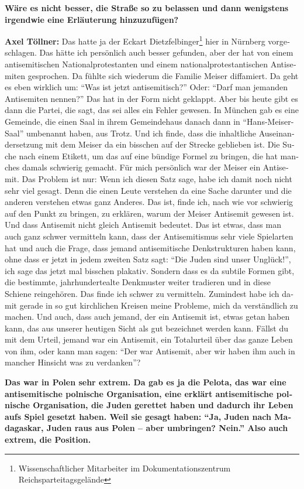 \begin{otherlanguage}{ngerman}
\textbf{Wäre es nicht besser, die Straße so zu belassen und dann wenigstens irgendwie eine Erläuterung hinzuzufügen?} 

\textbf{Axel Töllner:} Das hatte ja der Eckart Dietzfelbinger\footnote{Wissenschaftlicher Mitarbeiter im Dokumentationszentrum Reichsparteitagsgelände} hier in Nürnberg vorgeschlagen. Das hätte ich persönlich auch besser gefunden, aber der hat von einem antisemitischen Nationalprotestanten und einem nationalprotestantischen Antisemiten gesprochen. Da fühlte sich wiederum die Familie Meiser diffamiert. Da geht es eben wirklich um: "`Was ist jetzt antisemitisch?"' Oder: "`Darf man jemanden Antisemiten nennen?"' Das hat in der Form nicht geklappt. Aber bis heute gibt es dann die Partei, die sagt, das sei alles ein Fehler gewesen. In München gab es eine Gemeinde, die einen Saal in ihrem Gemeindehaus danach dann in "`Hans-Meiser-Saal"' umbenannt haben, aus Trotz. Und ich finde, dass die inhaltliche Auseinandersetzung mit dem Meiser da ein bisschen auf der Strecke geblieben ist. Die Suche nach einem Etikett, um das auf eine bündige Formel zu bringen, die hat manches damals schwierig gemacht. Für mich persönlich war der Meiser ein Antisemit. 
Das Problem ist nur: Wenn ich diesen Satz sage, habe ich damit noch nicht sehr viel gesagt. Denn die einen Leute verstehen da eine Sache darunter und die anderen verstehen etwas ganz Anderes. Das ist, finde ich, nach wie vor schwierig auf den Punkt zu bringen, zu erklären, warum der Meiser Antisemit gewesen ist. Und dass Antisemit nicht gleich Antisemit bedeutet. Das ist etwas, dass man auch ganz schwer vermitteln kann, dass der Antisemitismus sehr viele Spielarten hat und auch die Frage, dass jemand antisemitische Denkstrukturen haben kann, ohne dass er jetzt in jedem zweiten Satz sagt: "`Die Juden sind unser Unglück!"', ich sage das jetzt mal bisschen plakativ. Sondern dass es da subtile Formen gibt, die bestimmte, jahrhundertealte Denkmuster weiter tradieren und in diese Schiene reingehören. Das finde ich schwer zu vermitteln. Zumindest habe ich damit gerade in so gut kirchlichen Kreisen meine Probleme, mich da verständlich zu machen. Und auch, dass auch jemand, der ein Antisemit ist, etwas getan haben kann, das aus unserer heutigen Sicht als gut bezeichnet werden kann. Fällst du mit dem Urteil, jemand war ein Antisemit, ein Totalurteil über das ganze Leben von ihm, oder kann man sagen: "`Der war Antisemit, aber wir haben ihm auch in mancher Hinsicht was zu verdanken"'? 
 
\textbf{Das war in Polen sehr extrem. Da gab es ja die Pelota, das war eine antisemitische polnische Organisation, eine erklärt antisemitische polnische Organisation, die Juden gerettet haben und dadurch ihr Leben aufs Spiel gesetzt haben. Weil sie gesagt haben: "`Ja, Juden nach Madagaskar, Juden raus aus Polen – aber umbringen? Nein."' Also auch extrem, die Position.} 


\end{otherlanguage}
